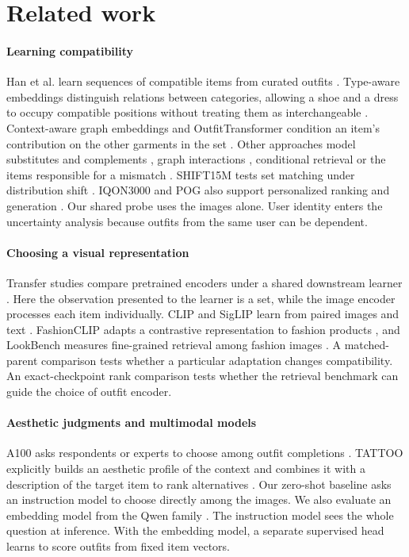 \section{Related work}
\paragraph{Learning compatibility}
Han et al. learn sequences of compatible items from curated outfits \cite{han2017bilstm}. Type-aware embeddings distinguish relations between categories, allowing a shoe and a dress to occupy compatible positions without treating them as interchangeable \cite{vasileva2018typeaware}. Context-aware graph embeddings and OutfitTransformer condition an item's contribution on the other garments in the set \cite{cucurull2019context,sarkar2023outfittransformer}. Other approaches model substitutes and complements \cite{mcauley2015styles,veit2015style,chen2018dress}, graph interactions \cite{ngnn,hfgn}, conditional retrieval \cite{scenet,csanet} or the items responsible for a mismatch \cite{wang2019mcn,balim2023diagnosing}. SHIFT15M tests set matching under distribution shift \cite{shift15}. IQON3000 and POG also support personalized ranking and generation \cite{song2019gpbpr,chen2019pog}. Our shared probe uses the images alone. User identity enters the uncertainty analysis because outfits from the same user can be dependent.

\paragraph{Choosing a visual representation}
Transfer studies compare pretrained encoders under a shared downstream learner \cite{kornblith2019transfer,ericsson2021transfer,battle}. Here the observation presented to the learner is a set, while the image encoder processes each item individually. CLIP and SigLIP learn from paired images and text \cite{radford2021clip,zhai2023siglip}. FashionCLIP adapts a contrastive representation to fashion products \cite{chia2022fashionclip,fashioncard}, and LookBench measures fine-grained retrieval among fashion images \cite{gao2026lookbench}. A matched-parent comparison tests whether a particular adaptation changes compatibility. An exact-checkpoint rank comparison tests whether the retrieval benchmark can guide the choice of outfit encoder.

\paragraph{Aesthetic judgments and multimodal models}
A100 asks respondents or experts to choose among outfit completions \cite{zou2022a100}. TATTOO explicitly builds an aesthetic profile of the context and combines it with a description of the target item to rank alternatives \cite{wu2025tattoo}. Our zero-shot baseline asks an instruction model to choose directly among the images. We also evaluate an embedding model from the Qwen family \cite{li2026qwen}. The instruction model sees the whole question at inference. With the embedding model, a separate supervised head learns to score outfits from fixed item vectors.

